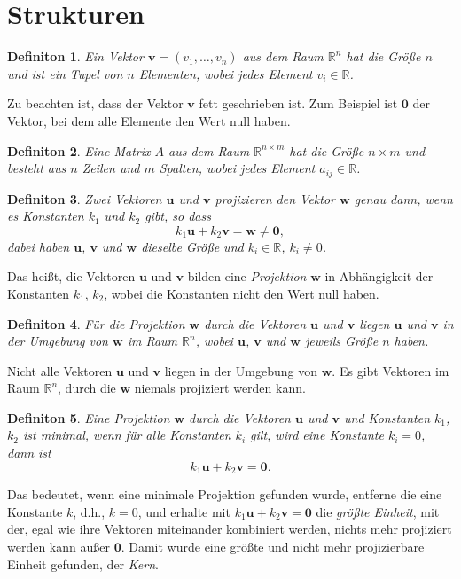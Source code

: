 \documentclass{report}
\newtheorem{definition}{Definiton}[section]
\numberwithin{equation}{section}
\begin{document}
\section{Strukturen}
\begin{definition}
	Ein Vektor $\boldsymbol{v} = (v_1, \ldots, v_n)$ aus dem Raum $\mathbb{R}^n$ hat die Größe $n$ und ist ein Tupel von $n$ Elementen, wobei jedes Element $v_i \in \mathbb{R}$.
\end{definition}
Zu beachten ist, dass der Vektor $\boldsymbol{v}$ fett geschrieben ist. Zum Beispiel ist $\boldsymbol{0}$ der Vektor, bei dem alle Elemente den Wert null haben.
\begin{definition}
	Eine Matrix $A$ aus dem Raum $\mathbb{R}^{n \times m}$ hat die Größe $n \times m$ und besteht aus $n$ Zeilen und $m$ Spalten, wobei jedes Element $a_{ij} \in \mathbb{R}$.
\end{definition}
\begin{definition}
   	Zwei Vektoren $\boldsymbol{u}$ und $\boldsymbol{v}$ projizieren den Vektor $\boldsymbol{w}$ genau dann, wenn es Konstanten $k_1$ und $k_2$ gibt, so dass $$k_1 \boldsymbol{u} + k_2\boldsymbol{v} = \boldsymbol{w} \neq \boldsymbol{0},$$ dabei haben $\boldsymbol{u}$, $\boldsymbol{v}$ und $\boldsymbol{w}$ dieselbe Größe und $k_i \in \mathbb{R}$, $k_i \neq 0$.
\end{definition}
Das heißt, die Vektoren $\boldsymbol{u}$ und $\boldsymbol{v}$ bilden eine \textit{Projektion} $\boldsymbol{w}$ in Abhängigkeit der Konstanten $k_1$, $k_2$, wobei die Konstanten nicht den Wert null haben.
\begin{definition}
	Für die Projektion $\boldsymbol{w}$ durch die Vektoren $\boldsymbol{u}$ und $\boldsymbol{v}$ liegen $\boldsymbol{u}$ und $\boldsymbol{v}$ in der Umgebung von $\boldsymbol{w}$ im Raum $\mathbb{R}^n$, wobei $\boldsymbol{u}$, $\boldsymbol{v}$ und $\boldsymbol{w}$ jeweils Größe $n$ haben.
\end{definition}
Nicht alle Vektoren $\boldsymbol{u}$ und $\boldsymbol{v}$ liegen in der Umgebung von $\boldsymbol{w}$. Es gibt Vektoren im Raum $\mathbb{R}^n$, durch die $\boldsymbol{w}$ niemals projiziert werden kann.
\begin{definition}
	Eine Projektion $\boldsymbol{w}$ durch die Vektoren $\boldsymbol{u}$ und $\boldsymbol{v}$ und Konstanten $k_1$, $k_2$ ist minimal, wenn für alle Konstanten $k_i$ gilt, wird eine Konstante $k_i = 0$, dann ist $$k_1 \boldsymbol{u} + k_2\boldsymbol{v} = \boldsymbol{0}.$$
\end{definition}
Das bedeutet, wenn eine minimale Projektion gefunden wurde, entferne die eine Konstante $k$, d.h., $k = 0$, und erhalte mit $k_1 \boldsymbol{u} + k_2\boldsymbol{v} = \boldsymbol{0}$ die \textit{größte Einheit}, mit der, egal wie ihre Vektoren miteinander kombiniert werden, nichts mehr projiziert werden kann außer $\boldsymbol{0}$. Damit wurde eine größte und nicht mehr projizierbare Einheit gefunden, der \textit{Kern}.
\end{document}
